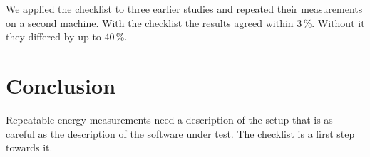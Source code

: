 \documentclass[acmsmall,review,anonymous]{acmart}
\begin{document}
We applied the checklist to three earlier studies and repeated their
measurements on a second machine. With the checklist the results agreed
within 3\,\%. Without it they differed by up to 40\,\%.

\section{Conclusion}

Repeatable energy measurements need a description of the setup that is as
careful as the description of the software under test. The checklist is a
first step towards it.
\end{document}
